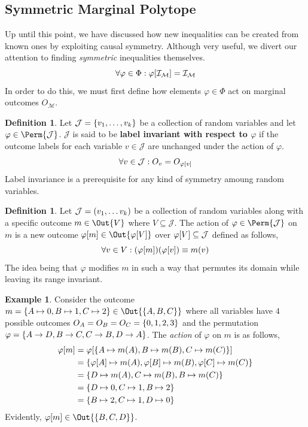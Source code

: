 \documentclass[aps, 10pt, english, twoside, pra, nofootinbib, longbibliography]{revtex4-1}
\theoremstyle{plain}
\theoremstyle{definition}
\newtheorem{definition}[theorem]{Definition}
\newtheorem{example}[theorem]{Example}
\theoremstyle{remark}
\newcommand{\gelem}{\varphi}
\newcommand{\action}[1]{\gelem\bs{#1}}
\newcommand{\mscenario}{\mathcal{M}}
\newcommand{\jointvar}{\mathcal{J}}
\newcommand{\term}[1]{\textcolor{Mahogany}{\textbf{#1}}}
\begin{document}
    \subsection{Symmetric Marginal Polytope}
    Up until this point, we have discussed how new inequalities can be created from known ones by exploiting causal symmetry. Although very useful, we divert our attention to finding \textit{symmetric} inequalities themselves.
    \[ \forall \gelem \in \Phi :  \action{\mathcal{I}_{\mscenario}} = \mathcal{I}_{\mscenario} \]
    In order to do this, we must first define how elements $\gelem \in \Phi$ act on marginal outcomes $O_{\mscenario}$.
    \begin{definition}
        Let $\jointvar = \bc{v_1, \ldots, v_k}$ be a collection of random variables and let $\gelem \in \Perm{\jointvar}$. $\jointvar$ is said to be \term{label invariant with respect to $\gelem$} if the outcome labels for each variable $v \in \jointvar$ are unchanged under the action of $\gelem$.
        \[ \forall v \in \jointvar : O_{v} = O_{\action{v}} \]
        Label invariance is a prerequisite for any kind of symmetry amoung random variables.
    \end{definition}
    \begin{definition}
        Let $\jointvar = \br{v_1, \ldots v_k}$ be a collection of random variables along with a specific outcome $m \in \Out{V}$ where $V \subseteq \jointvar$. The action of $\gelem \in \Perm{\jointvar}$ on $m$ is a new outcome $\action{m} \in \Out{\action{V}}$ over $\action{V} \subseteq \jointvar$ defined as follows,
        \[ \forall v \in V : \br{\action{m}}\br{\action{v}} \defined m \br{v} \]
        The idea being that $\gelem$ modifies $m$ in such a way that permutes its domain while leaving its range invariant.
    \end{definition}
    \begin{example}
        Consider the outcome $m = \bc{A \mapsto 0, B \mapsto 1, C \mapsto 2} \in \Out{\bc{A,B,C}}$ where all variables have $4$ possible outcomes $O_A = O_B = O_C = \bc{0,1,2,3}$ and the permutation $\gelem = \bc{A \to D, B \to C, C \to B, D \to A}$.
        The \textit{action} of $\gelem$ on $m$ is as follows,
        \begin{align*}
            \action{m} &= \action{\bc{A \mapsto m\br{A}, B \mapsto m\br{B}, C \mapsto m\br{C}}} \\
            &= \bc{\action{A} \mapsto m\br{A}, \action{B} \mapsto m\br{B}, \action{C} \mapsto m\br{C}} \\
            &= \bc{D \mapsto m\br{A}, C \mapsto m\br{B}, B \mapsto m\br{C}} \\
            &= \bc{D \mapsto 0, C \mapsto 1, B \mapsto 2} \\
            &= \bc{B \mapsto 2, C \mapsto 1, D \mapsto 0}
        \end{align*}
        Evidently, $\action{m} \in \Out{\bc{B, C, D}}$.
    \end{example}
\end{document}
